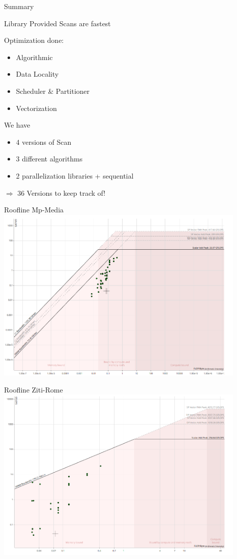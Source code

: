 \begin{frame}{Summary} 
\begin{center}
 Library Provided Scans are fastest\\
\end{center}
 
\pause
\vspace{5pt}
Optimization done:
\begin{itemize}
 \item Algorithmic
 \item Data Locality
 \item Scheduler \& Partitioner
 \item Vectorization
\end{itemize}
We have
\begin{itemize}
 \item 4 versions of Scan
 \item 3 different algorithms
 \item 2 parallelization libraries + sequential
\end{itemize}
\begin{center}
$\Rightarrow$ 36 Versions to keep track of! 
\end{center}

\end{frame} 
\begin{frame}{Roofline Mp-Media}
	\centering
	\vspace{-5pt}
	\includegraphics[width=0.90\textwidth]{wiki/roofline-media}
\end{frame}
\begin{frame}{Roofline Ziti-Rome}
	\centering
	\vspace{-5pt}
	\includegraphics[width=0.90\textwidth]{wiki/roofline-rome}
\end{frame}
